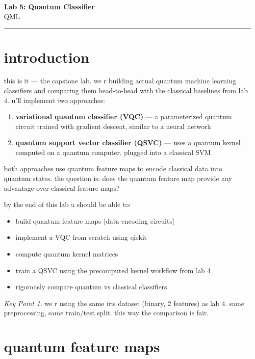 \documentclass[11pt,a4paper]{article}
\theoremstyle{definition}
\theoremstyle{remark}
\newtheorem*{keypoint}{Key Point}
\begin{document}
{\LARGE \textbf{Lab 5: Quantum Classifier}}\\[8pt]
{\large QML}\\[12pt]
\hrule

\vspace{16pt}

\section{introduction}

this is it --- the capstone lab. we r building actual quantum machine learning classifiers and comparing them head-to-head with the classical baselines from lab 4. u'll implement two approaches:

\begin{enumerate}[leftmargin=*]
  \item \textbf{variational quantum classifier (VQC)} --- a parameterized quantum circuit trained with gradient descent, similar to a neural network
  \item \textbf{quantum support vector classifier (QSVC)} --- uses a quantum kernel computed on a quantum computer, plugged into a classical SVM
\end{enumerate}

both approaches use quantum feature maps to encode classical data into quantum states. the question is: does the quantum feature map provide any advantage over classical feature maps?

by the end of this lab u should be able to:
\begin{itemize}[leftmargin=*]
  \item build quantum feature maps (data encoding circuits)
  \item implement a VQC from scratch using qiskit
  \item compute quantum kernel matrices
  \item train a QSVC using the precomputed kernel workflow from lab 4
  \item rigorously compare quantum vs classical classifiers
\end{itemize}

\begin{keypoint}
we r using the same iris dataset (binary, 2 features) as lab 4. same preprocessing, same train/test split. this way the comparison is fair.
\end{keypoint}

\section{quantum feature maps}
\end{document}
